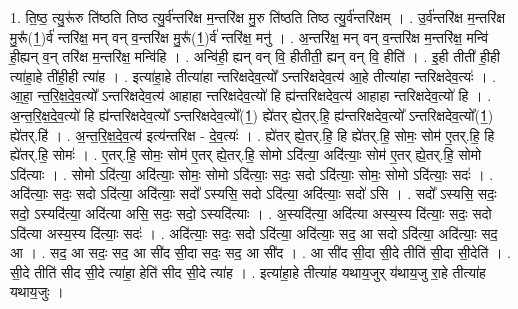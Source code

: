 \documentclass[17pt]{extarticle}
\begin{document}
1. ति॒ष्ठ॒ त्यु॒रू॑रु ति॑ष्ठति तिष्ठ त्यु॒र्व॑न्तरि॑क्ष म॒न्तरि॑क्ष मु॒रु ति॑ष्ठति तिष्ठ त्यु॒र्व॑न्तरि॑क्षम् । . उ॒र्व॑न्तरि॑क्ष म॒न्तरि॑क्ष मु॒रू᳚(1॒)र्व॑ न्तरि॑क्ष॒ मन् वन् व॒न्तरि॑क्ष मु॒रू᳚(1॒)र्व॑ न्तरि॑क्ष॒ मनु॑ । . अ॒न्तरि॑क्ष॒ मन् वन् व॒न्तरि॑क्ष म॒न्तरि॑क्ष॒ मन्वि॑ ही॒ह्यन् व॒न् तरि॑क्ष म॒न्तरि॑क्ष॒ मन्वि॑हि । . अन्वि॑ही॒ ह्यन् वन् वि॒ हीतीती॒ ह्यन् वन् वि॒ हीति॑ । . इ॒ही तीती॑ ही॒ही त्या॑हा॒हे ती॑ही॒ही त्या॑ह । . इत्या॑हा॒हे तीत्या॑हा न्तरिक्षदेव॒त्यो᳚ ऽन्तरिक्षदेव॒त्य॑ आ॒हे तीत्या॑हा न्तरिक्षदेव॒त्यः॑ । . आ॒हा॒ न्त॒रि॒क्ष॒दे॒व॒त्यो᳚ ऽन्तरिक्षदेव॒त्य॑ आहाहा न्तरिक्षदेव॒त्यो॑ हि ह्य॑न्तरिक्षदेव॒त्य॑ आहाहा न्तरिक्षदेव॒त्यो॑ हि । . अ॒न्त॒रि॒क्ष॒दे॒व॒त्यो॑ हि ह्य॑न्तरिक्षदेव॒त्यो᳚ ऽन्तरिक्षदेव॒त्यो᳚(1॒) ह्ये॑तर् ह्ये॒तर्.हि॒ ह्य॑न्तरिक्षदेव॒त्यो᳚ ऽन्तरिक्षदेव॒त्यो᳚(1॒) ह्ये॑तर्.हि॑ । . अ॒न्त॒रि॒क्ष॒दे॒व॒त्य॑ इत्य॑न्तरिक्ष - दे॒व॒त्यः॑ । . ह्ये॑तर् ह्ये॒तर्.हि॒ हि ह्ये॑तर्.हि॒ सोमः॒ सोम॑ ए॒तर्.हि॒ हि ह्ये॑तर्.हि॒ सोमः॑ । . ए॒तर्.हि॒ सोमः॒ सोम॑ ए॒तर् ह्ये॒तर्.हि॒ सोमो ऽदि॑त्या॒ अदि॑त्याः॒ सोम॑ ए॒तर् ह्ये॒तर्.हि॒ सोमो ऽदि॑त्याः । . सोमो ऽदि॑त्या॒ अदि॑त्याः॒ सोमः॒ सोमो ऽदि॑त्याः॒ सदः॒ सदो ऽदि॑त्याः॒ सोमः॒ सोमो ऽदि॑त्याः॒ सदः॑ । . अदि॑त्याः॒ सदः॒ सदो ऽदि॑त्या॒ अदि॑त्याः॒ सदो᳚ ऽस्यसि॒ सदो ऽदि॑त्या॒ अदि॑त्याः॒ सदो॑ ऽसि । . सदो᳚ ऽस्यसि॒ सदः॒ सदो॒ ऽस्यदि॑त्या॒ अदि॑त्या असि॒ सदः॒ सदो॒ ऽस्यदि॑त्याः । . अ॒स्यदि॑त्या॒ अदि॑त्या अस्य॒स्य दि॑त्याः॒ सदः॒ सदो ऽदि॑त्या अस्य॒स्य दि॑त्याः॒ सदः॑ । . अदि॑त्याः॒ सदः॒ सदो ऽदि॑त्या॒ अदि॑त्याः॒ सद॒ आ सदो ऽदि॑त्या॒ अदि॑त्याः॒ सद॒ आ । . सद॒ आ सदः॒ सद॒ आ सी॑द सी॒दा सदः॒ सद॒ आ सी॑द । . आ सी॑द सी॒दा सी॒दे तीति॑ सी॒दा सी॒देति॑ । . सी॒दे तीति॑ सीद सी॒दे त्या॑हा॒ हेति॑ सीद सी॒दे त्या॑ह । . इत्या॑हा॒हे तीत्या॑ह यथाय॒जुर् य॑थाय॒जु रा॒हे तीत्या॑ह यथाय॒जुः । \newline
\end{document}
